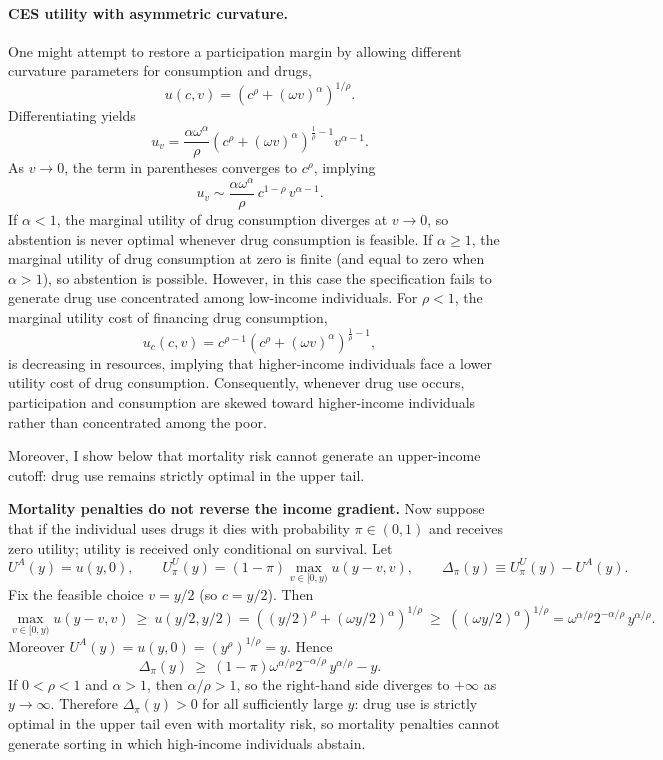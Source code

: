 \paragraph{CES utility with asymmetric curvature.}
One might attempt to restore a participation margin by allowing different curvature parameters for consumption and drugs,
\[
u(c,v)=\left(c^{\rho}+(\omega v)^{\alpha}\right)^{1/\rho}.
\]
Differentiating yields
\[
u_v
=\frac{\alpha \omega^{\alpha}}{\rho}
\left(c^{\rho}+(\omega v)^{\alpha}\right)^{\frac{1}{\rho}-1}
v^{\alpha-1}.
\]
As $v\to 0$, the term in parentheses converges to $c^{\rho}$, implying
\[
u_v \sim \frac{\alpha \omega^{\alpha}}{\rho}\,c^{1-\rho}\,v^{\alpha-1}.
\]
If $\alpha<1$, the marginal utility of drug consumption diverges at $v\to 0$, so abstention is never optimal whenever drug consumption is feasible. If $\alpha\ge 1$, the marginal utility of drug consumption at zero is finite (and equal to zero when $\alpha>1$), so abstention is possible. However, in this case the specification fails to generate drug use concentrated among low-income individuals. For $\rho<1$, the marginal utility cost of financing drug consumption,
\[
u_c(c,v)=c^{\rho-1}\left(c^{\rho}+(\omega v)^{\alpha}\right)^{\frac{1}{\rho}-1},
\]
is decreasing in resources, implying that higher-income individuals face a lower utility cost of drug consumption. Consequently, whenever drug use occurs, participation and consumption are skewed toward higher-income individuals rather than concentrated among the poor.

Moreover, I show below that mortality risk cannot generate an upper-income cutoff: drug use remains strictly optimal in the upper tail.

\medskip
\noindent\textbf{Mortality penalties do not reverse the income gradient.}
Now suppose that if the individual uses drugs it dies with probability $\pi\in(0,1)$ and receives zero utility; utility is received only conditional on survival. Let
\[
U^{A}(y)=u(y,0),\qquad
U^{U}_{\pi}(y)=(1-\pi)\max_{v\in[0,y)} u(y-v,v),
\qquad
\Delta_{\pi}(y)\equiv U^{U}_{\pi}(y)-U^{A}(y).
\]
Fix the feasible choice $v=y/2$ (so $c=y/2$). Then
\[
\max_{v\in[0,y)} u(y-v,v)\ \ge\ u(y/2,y/2)
=\left((y/2)^{\rho}+(\omega y/2)^{\alpha}\right)^{1/\rho}
\ \ge\ \left((\omega y/2)^{\alpha}\right)^{1/\rho}
=\omega^{\alpha/\rho}2^{-\alpha/\rho}\,y^{\alpha/\rho}.
\]
Moreover $U^{A}(y)=u(y,0)=\left(y^{\rho}\right)^{1/\rho}=y$. Hence
\[
\Delta_{\pi}(y)\ \ge\ (1-\pi)\omega^{\alpha/\rho}2^{-\alpha/\rho}\,y^{\alpha/\rho}-y.
\]
If $0<\rho<1$ and $\alpha>1$, then $\alpha/\rho>1$, so the right-hand side diverges to $+\infty$ as $y\to\infty$.
Therefore $\Delta_{\pi}(y)>0$ for all sufficiently large $y$: drug use is strictly optimal in the upper tail even with mortality risk, so mortality penalties cannot generate sorting in which high-income individuals abstain.

